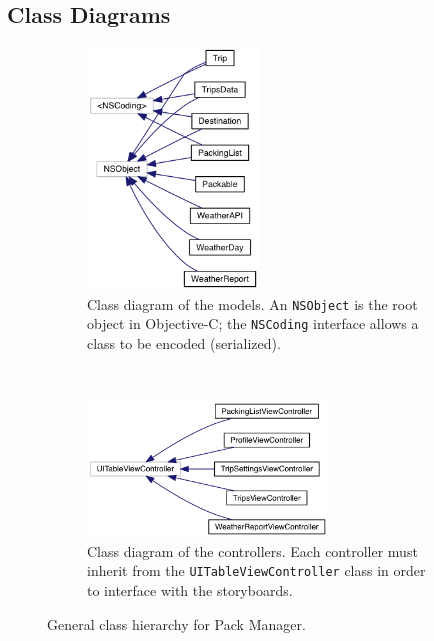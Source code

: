 \documentclass[11pt]{article}
\begin{document}
    \subsection{Class Diagrams}
    \begin{figure}
        \centering
        \begin{subfigure}[t]{0.45\textwidth}
            \centering
            \includegraphics[width=0.5\textwidth]{img/inherit_graph_1.png}
            \caption{Class diagram of the models. An \texttt{NSObject} is the root object in Objective-C; the \texttt{NSCoding} interface allows a class to be encoded (serialized).}
        \end{subfigure}%
        ~ 
        \begin{subfigure}[t]{0.45\textwidth} 
            \centering
            \includegraphics[width=0.7\textwidth]{img/inherit_graph_7.png}
            \caption{Class diagram of the controllers. Each controller must inherit from the \texttt{UITableViewController} class in order to interface with the storyboards.}
        \end{subfigure}
        \caption{General class hierarchy for Pack Manager.}
        \label{fig:classdiagram1}
    \end{figure}
\end{document}
